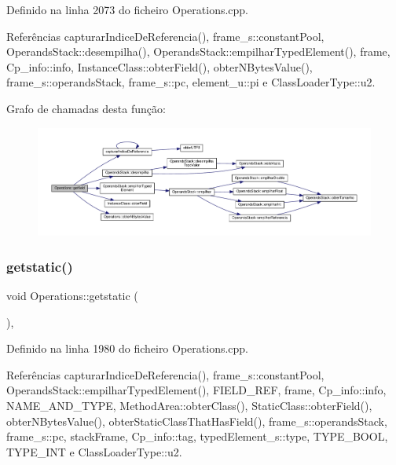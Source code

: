 Definido na linha 2073 do ficheiro Operations.\+cpp.



Referências capturar\+Indice\+De\+Referencia(), frame\+\_\+s\+::constant\+Pool, Operands\+Stack\+::desempilha(), Operands\+Stack\+::empilhar\+Typed\+Element(), frame, Cp\+\_\+info\+::info, Instance\+Class\+::obter\+Field(), obter\+N\+Bytes\+Value(), frame\+\_\+s\+::operands\+Stack, frame\+\_\+s\+::pc, element\+\_\+u\+::pi e Class\+Loader\+Type\+::u2.

Grafo de chamadas desta função\+:\nopagebreak
\begin{figure}[H]
\begin{center}
\leavevmode
\includegraphics[width=350pt]{classOperations_a0bb399fe0f64dc21699132c092560e19_cgraph}
\end{center}
\end{figure}
\mbox{\label{classOperations_a0514422a81aa3efa5cb8b3bd1a505a68}} 
\subsubsection{\texorpdfstring{getstatic()}{getstatic()}}
{\footnotesize\ttfamily void Operations\+::getstatic (\begin{DoxyParamCaption}{ }\end{DoxyParamCaption})\hspace{0.3cm}{\ttfamily [static]}, {\ttfamily [private]}}



Definido na linha 1980 do ficheiro Operations.\+cpp.



Referências capturar\+Indice\+De\+Referencia(), frame\+\_\+s\+::constant\+Pool, Operands\+Stack\+::empilhar\+Typed\+Element(), F\+I\+E\+L\+D\+\_\+\+R\+EF, frame, Cp\+\_\+info\+::info, N\+A\+M\+E\+\_\+\+A\+N\+D\+\_\+\+T\+Y\+PE, Method\+Area\+::obter\+Class(), Static\+Class\+::obter\+Field(), obter\+N\+Bytes\+Value(), obter\+Static\+Class\+That\+Has\+Field(), frame\+\_\+s\+::operands\+Stack, frame\+\_\+s\+::pc, stack\+Frame, Cp\+\_\+info\+::tag, typed\+Element\+\_\+s\+::type, T\+Y\+P\+E\+\_\+\+B\+O\+OL, T\+Y\+P\+E\+\_\+\+I\+NT e Class\+Loader\+Type\+::u2.

